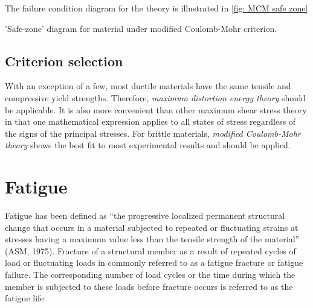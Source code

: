 \documentclass[
10pt,
a4paper,
openany,
svgnames,
]{kaobook} %
\begin{document}
The failure condition diagram for the theory is illustrated in \cref{fig: MCM safe zone}

\begin{marginfigure}
  \centering
  \caption{'Safe-zone' diagram for material under modified Coulomb-Mohr criterion.}
  \label{fig: MCM safe zone}
\end{marginfigure}

\subsection{Criterion selection}

With an exception of a few, most ductile materials have the same tensile and compressive yield strengths. Therefore, \emph{maximum distortion energy theory} should be applicable. It is also more convenient than other maximum shear stress theory in that one mathematical expression applies to all states of stress regardless of the signs of the principal stresses.
For brittle materials, \emph{modified Coulomb-Mohr theory} shows the best fit to most experimental results and should be applied.

\section{Fatigue} \label{section: fatigue failure}

Fatigue has been defined as “the progressive localized permanent structural change that occurs in a material subjected to repeated or fluctuating strains at stresses having a maximum value less than the tensile strength of the material” (ASM, 1975). Fracture of a structural member as a result of repeated cycles of load or fluctuating loads in commonly referred to as a fatigue fracture or fatigue failure. The corresponding number of load cycles or the time during which the member is subjected to these loads before fracture occurs is referred to as the fatigue life.
\end{document}
